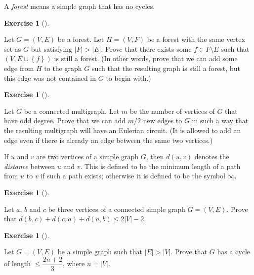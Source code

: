 \documentclass[numbers=enddot,12pt,final,onecolumn,notitlepage]{scrartcl}%
\newcounter{exer}
\theoremstyle{definition}
\newtheorem{exmp}[exer]{Exercise}
\newenvironment{exercise}[1][]
{\begin{exmp}[#1]\begin{leftbar}}
{\end{leftbar}\end{exmp}}
\newenvironment{noncompile}{}{}
\newcommand{\set}[1]{\left\{ #1 \right\}}
\newcommand{\abs}[1]{\left| #1 \right|}
\newcommand{\tup}[1]{\left( #1 \right)}
\begin{document}
\begin{noncompile}
A \textit{forest} means a simple graph that has no cycles.

\begin{exercise} \label{exe.mt1.forests-matroid}
Let $G = \tup{V, E}$ be a forest. Let $H = \tup{V, F}$ be a forest
with the same vertex set as $G$ but satisfying $\abs{F} > \abs{E}$.
Prove that there exists some $f \in F \setminus E$ such that
$\tup{V, E \cup \set{f}}$ is still a forest. (In other words, prove
that we can add some edge from $H$ to the graph $G$ such that the
resulting graph is still a forest, but this edge was not contained in
$G$ to begin with.)
\end{exercise}
\end{noncompile}

\begin{exercise} \label{exe.mt1.euler-add}
Let $G$ be a connected multigraph. Let $m$ be the number of vertices
of $G$ that have odd degree. Prove that we can add $m/2$ new edges to
$G$ in such a way that the resulting multigraph will have an Eulerian
circuit. (It is allowed to add an edge even if there is already an
edge between the same two vertices.)
\end{exercise}

If $u$ and $v$ are two vertices of a simple graph $G$, then
$d \tup{u, v}$ denotes the \textit{distance} between $u$ and $v$. This
is defined to be the minimum length of a path from $u$ to $v$ if
such a path exists; otherwise it is defined to be the symbol $\infty$.

\begin{exercise} \label{exe.mt1.d+d+d}
Let $a$, $b$ and $c$ be three vertices of a connected simple graph
$G = \tup{V, E}$.
Prove that
$d \tup{b, c} + d \tup{c, a} + d \tup{a, b} \leq 2 \abs{V} - 2$.
\end{exercise}

\begin{exercise} \label{exe.mt1.cyctree}
Let $G = \tup{V, E}$ be a simple graph such that $\abs{E} > \abs{V}$.
Prove that $G$ has a cycle of length $\leq \dfrac{2n+2}{3}$,
where $n = \abs{V}$.
\end{exercise}




\end{document}
